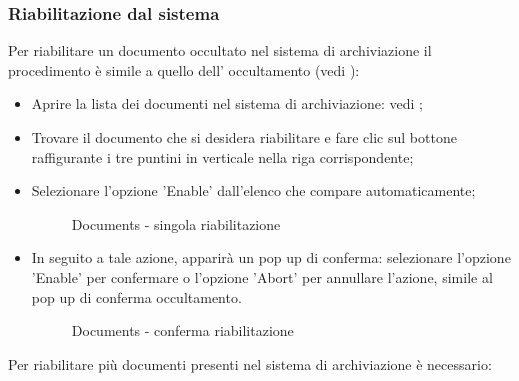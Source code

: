 \documentclass[10pt, a4paper]{article}
\begin{document}
\subsubsection{Riabilitazione dal sistema}
Per riabilitare un documento occultato nel sistema di archiviazione il procedimento è simile a quello dell' occultamento (vedi ):
\begin{itemize}
    \item Aprire la lista dei documenti nel sistema di archiviazione: vedi ;
    \item Trovare il documento che si desidera riabilitare e fare clic sul bottone raffigurante i tre puntini in verticale nella riga corrispondente;
    \item Selezionare l'opzione 'Enable' dall'elenco che compare automaticamente;
    \begin{figure}[H]
        \centering  
        \caption{Documents - singola riabilitazione}
        \label{img:enableSel}
    \end{figure}
    \item In seguito a tale azione, apparirà un pop up di conferma: selezionare l'opzione 'Enable' per confermare o l'opzione 'Abort' per annullare l'azione, simile al pop up di conferma occultamento.
    \begin{figure}[H]
        \centering  
        \caption{Documents - conferma riabilitazione}
        \label{img:confirmEnable}
    \end{figure}
\end{itemize}
Per riabilitare più documenti presenti nel sistema di archiviazione è necessario:
\end{document}
